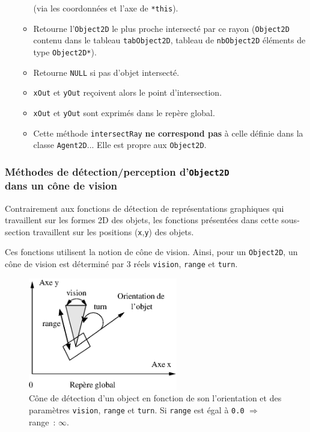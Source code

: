 \documentclass[12pt]{article}
\begin{document}
\begin{itemize}
\begin{itemize}
      (via les coordonn\'ees et l'axe de \verb!*this!).
      \item Retourne l'{\tt Object2D} le plus proche intersect\'e par ce
      rayon ({\tt Object2D} contenu dans le tableau \verb!tabObject2D!,
      tableau de {\tt nbObject2D} \'el\'ements de type {\tt Object2D*}).
      \item Retourne \verb!NULL! si pas d'objet intersect\'e.
      \item \verb!xOut! et \verb!yOut! re\c coivent alors le point
      d'intersection.
      \item \verb!xOut! et \verb!yOut! sont exprim\'es dans le rep\`ere global.
      \item Cette m\'ethode {\tt intersectRay} {\bf ne correspond pas}
            \`a celle d\'efinie dans la classe {\tt Agent2D}...
            Elle est propre aux {\tt Object2D}.
      \end{itemize}
\end{itemize}

\subsubsection{M\'ethodes de d\'etection/perception d'{\tt Object2D}\\
dans un c\^one de vision}

\vspace{0.2cm}
Contrairement aux fonctions de d\'etection de repr\'esentations graphiques
qui travaillent sur les formes 2D des objets, les fonctions pr\'esent\'ees
dans cette sous-section travaillent sur les positions ({\tt x},{\tt y}) des
objets.

\vspace{0.4cm}
Ces fonctions utilisent la notion de c\^one de vision.
Ainsi, pour un {\tt Object2D}, un c\^one de vision est
d\'etermin\'e par 3 r\'eels {\tt vision}, {\tt range} et {\tt turn}.

\vspace{0.2cm}
\begin{figure}[hbtp]
\begin{center}
\includegraphics[width=6.5cm]{fig/cone}
\end{center}
\caption{C\^one de d\'etection d'un object en fonction de son l'orientation
et des param\`etres {\tt vision}, {\tt range} et {\tt turn}.
Si {\tt range} est \'egal \`a {\tt 0.0} $\Longrightarrow$ range~: $\infty$.}
\end{figure}
\end{document}
